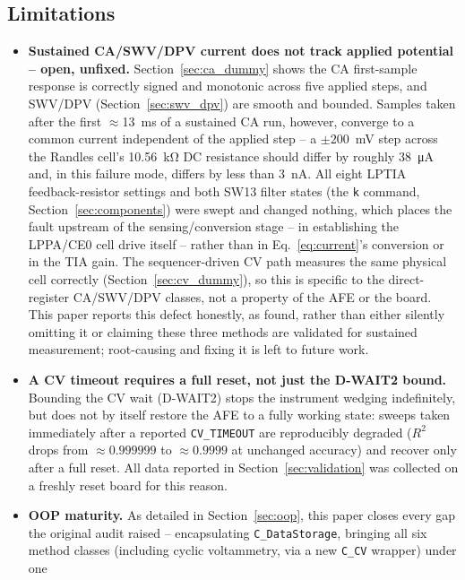 \subsection{Limitations}
\label{sec:limitations}
\begin{itemize}
\item \textbf{Sustained CA/SWV/DPV current does not track applied
  potential -- open, unfixed.} Section~\ref{sec:ca_dummy} shows the CA
  first-sample response is correctly signed and monotonic across five
  applied steps, and SWV/DPV (Section~\ref{sec:swv_dpv}) are smooth and
  bounded. Samples taken after the first $\approx$\SI{13}{\milli\second}
  of a sustained CA run, however, converge to a common current
  independent of the applied step -- a $\pm200$~mV step across the
  Randles cell's \SI{10.56}{\kilo\ohm} DC resistance should differ by
  roughly \SI{38}{\micro\ampere} and, in this failure mode, differs by
  less than \SI{3}{\nano\ampere}. All eight LPTIA feedback-resistor
  settings and both SW13 filter states (the \texttt{k} command,
  Section~\ref{sec:components}) were swept and changed nothing, which
  places the fault upstream of the sensing/conversion stage -- in
  establishing the LPPA/CE0 cell drive itself -- rather than in
  Eq.~\eqref{eq:current}'s conversion or in the TIA gain. The
  sequencer-driven CV path measures the same physical cell correctly
  (Section~\ref{sec:cv_dummy}), so this is specific to the direct-register
  CA/SWV/DPV classes, not a property of the AFE or the board. This paper
  reports this defect honestly, as found, rather than either silently
  omitting it or claiming these three methods are validated for sustained
  measurement; root-causing and fixing it is left to future work.
\item \textbf{A CV timeout requires a full reset, not just the D-WAIT2
  bound.} Bounding the CV wait (D-WAIT2) stops the instrument wedging
  indefinitely, but does not by itself restore the AFE to a fully working
  state: sweeps taken immediately after a reported \texttt{CV\_TIMEOUT}
  are reproducibly degraded ($R^2$ drops from $\approx0.999999$ to
  $\approx0.9999$ at unchanged accuracy) and recover only after a full
  reset. All data reported in Section~\ref{sec:validation} was collected
  on a freshly reset board for this reason.
\item \textbf{OOP maturity.} As detailed in Section~\ref{sec:oop}, this
  paper closes every gap the original audit raised -- encapsulating
  \texttt{C\_DataStorage}, bringing all six method classes (including
  cyclic voltammetry, via a new \texttt{C\_CV} wrapper) under one

\end{itemize}
